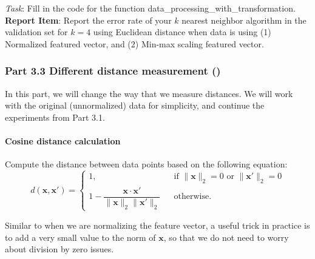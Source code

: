 \noindent \emph{Task}: Fill in the code for the function \colorbox{Gainsboro!60!Lavender}{data\_processing\_with\_transformation}.\\

\noindent \textbf{Report Item}: Report the error rate of your $k$ nearest neighbor algorithm in the validation set for $k=4$ using Euclidean distance when data is using (1) Normalized featured vector, and (2) Min-max scaling featured vector.


\subsubsection*{Part 3.3 Different distance measurement ()}

In this part, we will change the way that we measure distances. We will work with the original (unnormalized) data for simplicity, and continue the experiments from Part 3.1. 


\paragraph{Cosine distance calculation}
Compute the distance between data points based on the following equation:
$$ d(\mathbf{x}, \mathbf{x}')=\left\{
\begin{array}{lcl}
1, &  & \text{if } \|\mathbf{x}\|_2 = 0 \text{ or } \|\mathbf{x}'\|_2 = 0 \\
1- \dfrac{\mathbf{x} \cdot \mathbf{x}'}{\|\mathbf{x}\|_2\|\mathbf{x}'\|_2} & & \text{otherwise}.
\end{array}
\right.
$$

Similar to when we are normalizing the feature vector, a useful trick in practice is to add a  very small value to the norm of $\mathbf{x}$, so that we do not need to worry about  division by zero issues.\\

